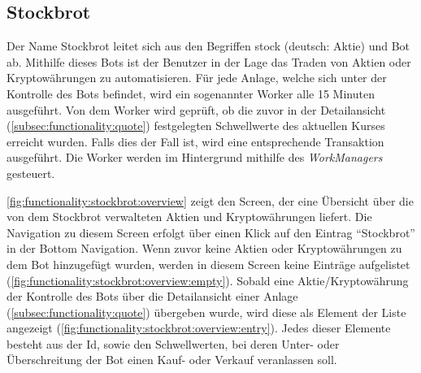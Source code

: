\documentclass[a4paper]{article}
\begin{document}
\subsection{Stockbrot}
\label{subsec:functionality:stockbrot}
Der Name Stockbrot leitet sich aus den Begriffen stock (deutsch: Aktie) und Bot ab. Mithilfe dieses Bots ist der Benutzer in der Lage das Traden von Aktien oder Kryptowährungen zu automatisieren. Für jede Anlage, welche sich unter der Kontrolle des Bots befindet, wird ein sogenannter Worker alle 15 Minuten ausgeführt. Von dem Worker wird geprüft, ob die zuvor in der Detailansicht (\autoref{subsec:functionality:quote}) festgelegten Schwellwerte des aktuellen Kurses erreicht wurden. Falls dies der Fall ist, wird eine entsprechende Transaktion ausgeführt. Die Worker werden im Hintergrund mithilfe des \textit{WorkManagers} gesteuert.

\autoref{fig:functionality:stockbrot:overview} zeigt den Screen, der eine Übersicht über die von dem Stockbrot verwalteten Aktien und Kryptowährungen liefert. Die Navigation zu diesem Screen erfolgt über einen Klick auf den Eintrag "`Stockbrot"' in der Bottom Navigation. Wenn zuvor keine Aktien oder Kryptowährungen zu dem Bot hinzugefügt wurden, werden in diesem Screen keine Einträge aufgelistet (\autoref{fig:functionality:stockbrot:overview:empty}). Sobald eine Aktie/Kryptowährung der Kontrolle des Bots über die Detailansicht einer Anlage (\autoref{subsec:functionality:quote}) übergeben wurde, wird diese als Element der Liste angezeigt (\autoref{fig:functionality:stockbrot:overview:entry}). Jedes dieser Elemente besteht aus der Id, sowie den Schwellwerten, bei deren Unter- oder Überschreitung der Bot einen Kauf- oder Verkauf veranlassen soll.
\end{document}
